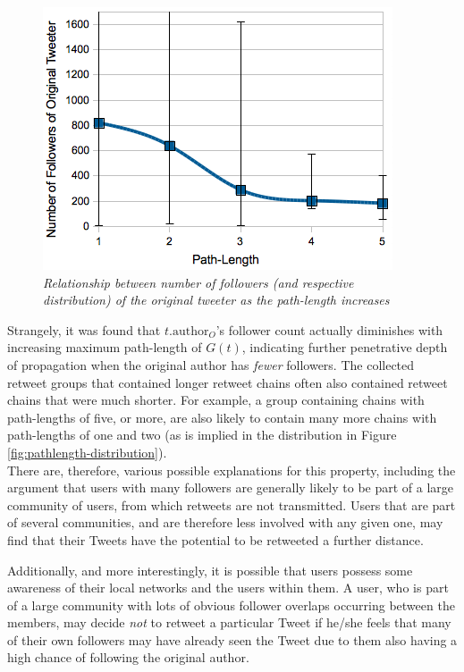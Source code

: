 \begin{figure}[h]
\centering
\includegraphics[scale=0.6]{3.Chapter1/Media/originalfollowers-pathlength-distribution.png} 
\caption{\textit{Relationship between number of followers (and respective distribution) of the original tweeter as the path-length increases}}
\label{fig:originalfollowers-pathlength}
\end{figure}

Strangely, it was found that $t.\textrm{author}_O$'s follower count actually diminishes with increasing maximum path-length of $G(t)$, indicating further penetrative depth of propagation when the original author has \textit{fewer} followers. The collected retweet groups that contained longer retweet chains often also contained retweet chains that were much shorter. For example, a group containing chains with path-lengths of five, or more, are also likely to contain many more chains with path-lengths of one and two (as is implied in the distribution in Figure \ref{fig:pathlength-distribution}).\\
There are, therefore, various possible explanations for this property, including the argument that users with many followers are generally likely to be part of a large community of users, from which retweets are not transmitted. Users that are part of several communities, and are therefore less involved with any given one, may find that their Tweets have the potential to be retweeted a further distance.

Additionally, and more interestingly, it is possible that users possess some awareness of their local networks and the users within them. A user, who is part of a large community with lots of obvious follower overlaps occurring between the members, may decide \textit{not} to retweet a particular Tweet if he/she feels that many of their own followers may have already seen the Tweet due to them also having a high chance of following the original author.

